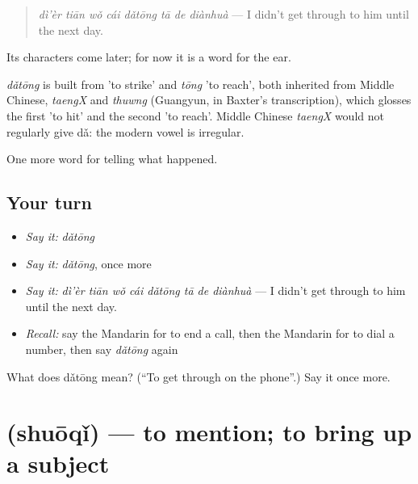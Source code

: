 \begin{quote}
\emph{dì'èr tiān wǒ cái dǎtōng tā de diànhuà} — I didn't get through to him until the next day.
\end{quote}

Its characters come later; for now it is a word for the ear.

\begin{cousinweb}
\emph{dǎtōng} is built from  'to strike' and \emph{tōng} 'to reach', both inherited from Middle Chinese, \emph{taengX} and \emph{thuwng} (Guangyun, in Baxter's transcription), which glosses the first 'to hit' and the second 'to reach'. Middle Chinese \emph{taengX} would not regularly give dǎ: the modern vowel is irregular.
\end{cousinweb}

\begin{grammarlens}[title={What you've built}]
One more word for telling what happened.
\end{grammarlens}

\subsection*{Your turn}
\begin{itemize}
\raggedright
  \item \emph{Say it:} \emph{dǎtōng}
  \item \emph{Say it:} \emph{dǎtōng}, once more
  \item \emph{Say it:} \emph{dì'èr tiān wǒ cái dǎtōng tā de diànhuà} — I didn't get through to him until the next day.
  \item \emph{Recall:} say the Mandarin for to end a call, then the Mandarin for to dial a number, then say \emph{dǎtōng} again
\end{itemize}

\begin{tcolorbox}[breakable,colback=teal!4,colframe=teal!35!black,title={Before you move on}]
What does dǎtōng mean? (\textquotedblleft{}To get through on the phone\textquotedblright{}.) Say it once more.
\end{tcolorbox}
\section[\texorpdfstring{\zh{说起} (shuōqǐ)}{说起 (shuōqǐ)}]{ (shuōqǐ) — to mention; to bring up a subject}

\label{lesson:ZH-C320-shuoqi}



